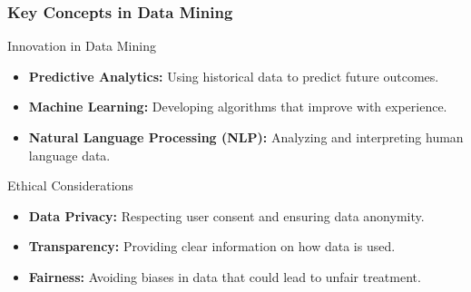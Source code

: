 \documentclass{beamer}
\begin{document}
\begin{frame}[fragile]
    \frametitle{Key Concepts in Data Mining}
    \begin{block}{Innovation in Data Mining}
        \begin{itemize}
            \item \textbf{Predictive Analytics:} Using historical data to predict future outcomes.
            \item \textbf{Machine Learning:} Developing algorithms that improve with experience.
            \item \textbf{Natural Language Processing (NLP):} Analyzing and interpreting human language data.
        \end{itemize}
    \end{block}

    \begin{block}{Ethical Considerations}
        \begin{itemize}
            \item \textbf{Data Privacy:} Respecting user consent and ensuring data anonymity.
            \item \textbf{Transparency:} Providing clear information on how data is used.
            \item \textbf{Fairness:} Avoiding biases in data that could lead to unfair treatment.
        \end{itemize}
    \end{block}
\end{frame}
\end{document}
